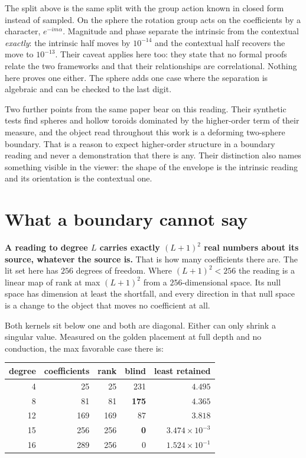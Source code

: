 The split above is the same split with the group action known in closed form instead of sampled. On the sphere the rotation group acts on the coefficients by a character, \(e^{-im\alpha}\). Magnitude and phase separate the intrinsic from the contextual \emph{exactly}: the intrinsic half moves by \(10^{-14}\) and the contextual half recovers the move to \(10^{-13}\). Their caveat applies here too: they state that no formal proofs relate the two frameworks and that their relationships are correlational. Nothing here proves one either. The sphere adds one case where the separation is algebraic and can be checked to the last digit.

Two further points from the same paper bear on this reading. Their synthetic tests find spheres and hollow toroids dominated by the higher-order term of their measure, and the object read throughout this work is a deforming two-sphere boundary. That is a reason to expect higher-order structure in a boundary reading and never a demonstration that there is any. Their distinction also names something visible in the viewer: the shape of the envelope is the intrinsic reading and its orientation is the contextual one.

\section{What a boundary cannot say}
\label{sec:rank}

\textbf{A reading to degree \(L\) carries exactly \((L+1)^2\) real numbers about its source, whatever the source is.} That is how many coefficients there are. The lit set here has \(256\) degrees of freedom. Where \((L+1)^2 < 256\) the reading is a linear map of rank at max \((L+1)^2\) from a \(256\)-dimensional space. Its null space has dimension at least the shortfall, and every direction in that null space is a change to the object that moves no coefficient at all.

Both kernels sit below one and both are diagonal. Either can only shrink a singular value. Measured on the golden placement at full depth and no conduction, the max favorable case there is:

\begin{center}
\begin{tabular}{rrrrr}
\toprule
degree & coefficients & rank & blind & least retained \\
\midrule
4 & 25 & 25 & 231 & \(4.495\) \\
8 & 81 & 81 & \textbf{175} & \(4.365\) \\
12 & 169 & 169 & 87 & \(3.818\) \\
15 & 256 & 256 & \textbf{0} & \(3.474 \times 10^{-3}\) \\
16 & 289 & 256 & 0 & \(1.524 \times 10^{-1}\) \\
\bottomrule
\end{tabular}
\end{center}

